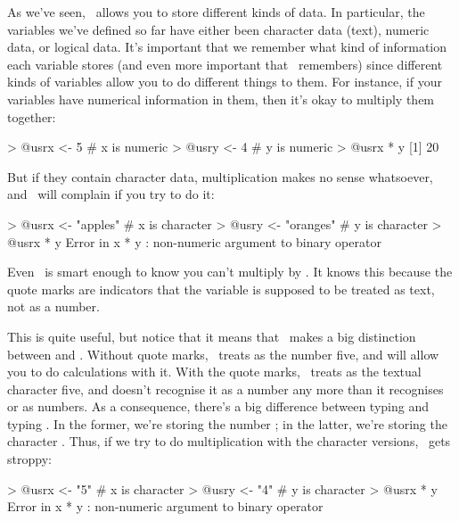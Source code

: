 As we've seen, \R\ allows you to store different kinds of data. In particular, the variables we've defined so far have either been character data (text), numeric data, or logical data. It's important that we remember what kind of information each variable stores (and even more important that \R\ remembers) since different kinds of variables allow you to do different things to them. For instance, if your variables have numerical information in them, then it's okay to multiply them together:
\begin{rblock1}
> @usr{x <- 5}   # x is numeric
> @usr{y <- 4}   # y is numeric
> @usr{x * y}    
[1] 20
\end{rblock1}
But if they contain character data, multiplication makes no sense whatsoever, and \R\ will complain if you try to do it:
\begin{rblock1}
> @usr{x <- "apples"}   # x is character
> @usr{y <- "oranges"}  # y is character
> @usr{x * y}           
Error in x * y : non-numeric argument to binary operator
\end{rblock1}
Even \R\ is smart enough to know you can't multiply  by . It knows this because the quote marks are indicators that the variable is supposed to be treated as text, not as a number. 

This is quite useful, but notice that it means that \R\ makes a big distinction between  and . Without quote marks, \R\ treats  as the number five, and will allow you to do calculations with it. With the quote marks, \R\ treats  as the textual character five, and doesn't recognise it as a number any more than it recognises  or  as numbers.  As a consequence, there's a big difference between typing  and typing . In the former, we're storing the number ; in the latter, we're storing the character . Thus, if we try to do multiplication with the character versions, \R\ gets stroppy:
\begin{rblock1}
> @usr{x <- "5"}   # x is character
> @usr{y <- "4"}   # y is character
> @usr{x * y}     
Error in x * y : non-numeric argument to binary operator
\end{rblock1}

